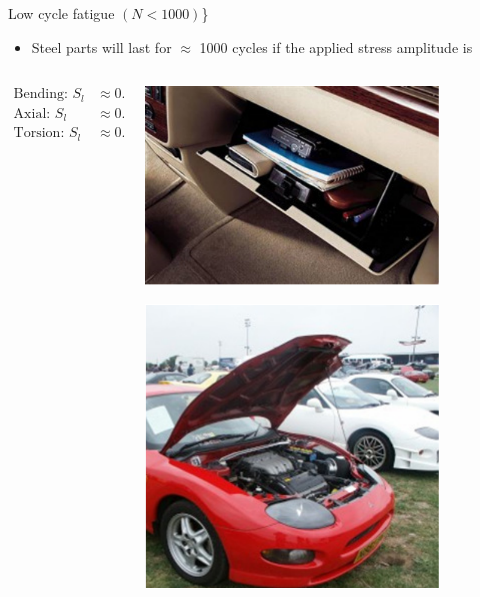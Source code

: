 \documentclass[10pt, svgnames]{beamer}
\begin{document}
\begin{frame}[label={sec:orgf604e5f}]{Low cycle fatigue \((N < 1000)\)\}}
\begin{itemize}
\item Steel parts will last for \(\approx\) 1000 cycles if the applied stress amplitude is
\end{itemize}

\begin{columns}
\begin{column}{0.5\columnwidth}
\begin{align*}
  \text{Bending: } S_l &\approx 0.9S_{ut} \\
  \text{Axial: } S_l &\approx 0.75S_{ut} \\
  \text{Torsion: } S_l &\approx 0.72S_{ut}
\end{align*}
\end{column}

\begin{column}{0.5\columnwidth}
\begin{center}
\includegraphics[width=0.8\textwidth]{pictures/glove-comp.pdf}
\end{center}
\begin{center}
\includegraphics[width=0.8\textwidth]{pictures/car-hood.pdf}
\end{center}
\end{column}
\end{columns}
\end{frame}
\end{document}
